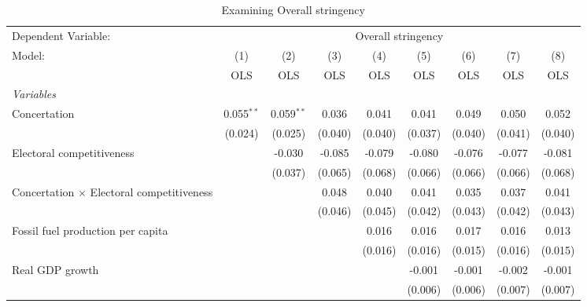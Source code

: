 
\begin{table}[htbp]
   \caption{Examining Overall stringency}
   \centering
   \begin{tabular}{lcccccccc}
      \toprule
      Dependent Variable: & \multicolumn{8}{c}{Overall stringency}\\
      Model:                                           & (1)          & (2)          & (3)     & (4)     & (5)     & (6)     & (7)     & (8)\\  
                                                       &  OLS         & OLS          & OLS     & OLS     & OLS     & OLS     & OLS     & OLS\\  
      \midrule
      \emph{Variables}\\
      Concertation                                     & 0.055$^{**}$ & 0.059$^{**}$ & 0.036   & 0.041   & 0.041   & 0.049   & 0.050   & 0.052\\   
                                                       & (0.024)      & (0.025)      & (0.040) & (0.040) & (0.037) & (0.040) & (0.041) & (0.040)\\   
      Electoral competitiveness                        &              & -0.030       & -0.085  & -0.079  & -0.080  & -0.076  & -0.077  & -0.081\\   
                                                       &              & (0.037)      & (0.065) & (0.068) & (0.066) & (0.066) & (0.066) & (0.068)\\   
      Concertation $\times$ Electoral competitiveness  &              &              & 0.048   & 0.040   & 0.041   & 0.035   & 0.037   & 0.041\\   
                                                       &              &              & (0.046) & (0.045) & (0.042) & (0.043) & (0.042) & (0.043)\\   
      Fossil fuel production per capita                &              &              &         & 0.016   & 0.016   & 0.017   & 0.016   & 0.013\\   
                                                       &              &              &         & (0.016) & (0.016) & (0.015) & (0.016) & (0.015)\\   
      Real GDP growth                                  &              &              &         &         & -0.001  & -0.001  & -0.002  & -0.001\\   
                                                       &              &              &         &         & (0.006) & (0.006) & (0.007) & (0.007)\\   

\end{tabular}
\end{table}
